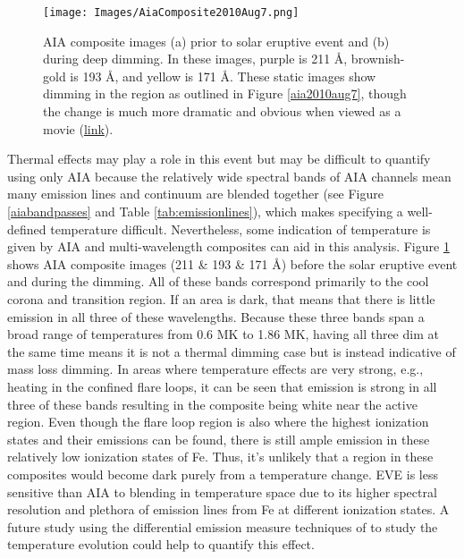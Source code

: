 \begin{figure}[!h]
    \begin{center}
	    \texttt{[image: Images/AiaComposite2010Aug7.png]}
    \end{center}
    \caption[AIA before/after images of 2010 August 7 event]{
	    AIA composite images (a) prior to solar eruptive event and (b) during deep dimming. In these images, purple is 
	    211 \AA, brownish-gold is 193 \AA, and yellow is 171 \AA. These static images show dimming in the region as outlined 
	    in Figure \ref{aia2010aug7}, though the change is much more dramatic and obvious when viewed as a movie 
	    (\href{http://sdowww.lmsal.com/sdomedia/SunInTime/2010/08/07/daily_20100807_211-193-171.mov}{link}). 
	}
    \label{aiacomposite2010aug7}
\end{figure}

Thermal effects may play a role in this event but may be difficult to quantify using only AIA because the relatively wide spectral bands of AIA channels mean many emission lines and continuum are blended together (see Figure \ref{aiabandpasses} and Table \ref{tab:emissionlines}), which makes specifying a well-defined temperature difficult. Nevertheless, some indication of temperature is given by AIA and multi-wavelength composites can aid in this analysis. Figure \ref{aiacomposite2010aug7} shows AIA composite images (211 \& 193 \& 171 \AA) before the solar eruptive event and during the dimming. All of these bands correspond primarily to the cool corona and transition region. If an area is dark, that means that there is little emission in all three of these wavelengths. Because these three bands span a broad range of temperatures from 0.6 MK to 1.86 MK, having all three dim at the same time means it is not a thermal dimming case but is instead indicative of mass loss dimming. In areas where temperature effects are very strong, e.g., heating in the confined flare loops, it can be seen that emission is strong in all three of these bands resulting in the composite being white near the active region. Even though the flare loop region is also where the highest ionization states and their emissions can be found, there is still ample emission in these relatively low ionization states of Fe. Thus, it's unlikely that a region in these composites would become dark purely from a temperature change. EVE is less sensitive than AIA to blending in temperature space due to its higher spectral resolution and plethora of emission lines from Fe at different ionization states. A future study using the differential emission measure techniques of \citet{Caspi2014} to study the temperature evolution could help to quantify this effect.

